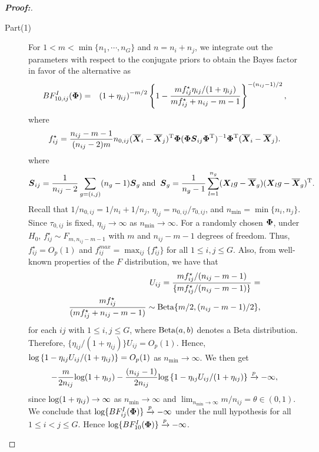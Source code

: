 \documentclass[12pt]{article}
\theoremstyle{plain}%
\theoremstyle{definition}
\def\log{\hbox{log}}
\def\Beta{\hbox{Beta}}
\def\log{\hbox{log}}
\def\Beta{\hbox{Beta}}
\def\bse{\begin{eqnarray*}}
\def\ese{\end{eqnarray*}}
\def\be{\begin{eqnarray}}
\def\ee{\end{eqnarray}}
\def\trans{^{\rm T}}
\newcommand{\uS}       {\mbox{\boldmath$S$}}
\newcommand{\uX}       {\mbox{\boldmath$X$}}
\newcommand{\uPhi}              {\mbox{\boldmath$\Phi$}}
\begin{document}
\begin{proof}[\textbf{\upshape Proof:}]
\begin{description}
\item[Part(1)]
For $1 < m < \min\{ n_1, \cdots, n_{G} \}$ and $n = n_i + n_j$, we integrate out the parameters with respect to the conjugate priors to obtain the Bayes factor in favor of the alternative as
\be
BF^{I}_{10,ij}(\uPhi) &=&\left(1 + \eta_{ij} \right)^{-m/2} \left\{ 1 -  \frac{ m f_{ij}^{\star} \eta_{ij}/(1 + \eta_{ij}) }{ m f_{ij}^{\star}  + n_{ij} - m - 1} \right\}^{-(n_{ij}-1)/2} \nonumber,
\ee
where
\bse
f_{ij}^{\star}  = \frac{n_{ij} - m - 1}{(n_{ij}-2)m} n_{0,ij}(\overline{\uX}_i - \overline{\uX}_j)\trans \uPhi(\uPhi \uS_{ij}\uPhi\trans )^{-1}\uPhi\trans (\overline{\uX}_{i} - \overline{\uX}_{j}).
\ese
where $$ \uS_{ij} = \frac{1}{n_{ij} - 2} \sum_{g=(i,j)}(n_g -1)\uS_{g}\; \text{and} \;\; \uS_g = \frac{1}{n_g - 1}\sum^{n_g}_{l=1}(\uX_lg - \overline{\uX}_{g})(\uX_lg - \overline{\uX}_{g})\trans.$$
Recall that $1/n_{0,ij} = 1/n_i + 1/n_j$, $\eta_{ij} = n_{0,ij}/\tau_{0,ij}$, and $n_{\min} = \min\{n_i, n_j\}$.
Since $\tau_{0,ij}$ is fixed, $\eta_{ij} \rightarrow \infty$ as $n_{\min} \to \infty$.
For a randomly chosen $\uPhi$, under $H_{0}$, $f_{ij}^{\star}  \sim F_{m, n_{ij}-m-1}$ with $m$ and $n_{ij} - m -1$ degrees of freedom.
Thus, $f_{ij}^{\star} = O_{p}(1)$ and $f^{max}_{ij} = \max_{ij}\{ f^{\star}_{ij}\}$ for all $1 \leq i, j \leq G$.
Also, from well-known properties of the $F$ distribution, we have that
\bse
U_{ij} = \frac{m f_{ij}^{\star}/(n_{ij}-m-1 )}{\{m f_{ij}^{\star}/(n_{ij} - m - 1 )\}} = \nonumber \\
  \frac{m f_{ij}^{\star}}{( m f_{ij}^{\star} + n_{ij} - m-1)} \sim \Beta\{m/2, (n_{ij}-m-1)/2 \},
\ese
for each $ij$ with $1 \leq i, j \leq G$, where $\Beta(a, b)$ denotes a Beta distribution.
Therefore, $\{\eta_{ij}/(1 + \eta_{ij})\} U_{ij} = O_{p}(1)$.
Hence, $\log\left\{ 1 -  \eta_{ij} U_{ij}/(1 + \eta_{ij}) \right\} = O_{p}(1)$ as $n_{\min} \to \infty$. We then get
\bse
-\frac{m}{2n_{ij}}\log(1 + \eta_{ij}) -\frac{(n_{ij}-1)}{2n_{ij}}\log\left\{ 1 -  \eta_{ij} U_{ij}/(1 + \eta_{ij}) \right\} \xrightarrow[]{p} -\infty,
\ese
since $\log(1 + \eta_{ij}) \rightarrow \infty$ as $n_{\min} \rightarrow \infty$ and $\lim_{n_{\min} \rightarrow \infty} m/n_{ij} = \theta \in (0, 1)$.
We conclude that $\log\{BF^{I}_{ij}(\uPhi)\} \xrightarrow[]{p} -\infty$ under the null hypothesis for all $1 \leq i < j \leq G$.
Hence $\log\{BF^{I}_{10}(\uPhi)\} \xrightarrow[]{p} -\infty$.


\end{description}
\end{proof}
\end{document}
